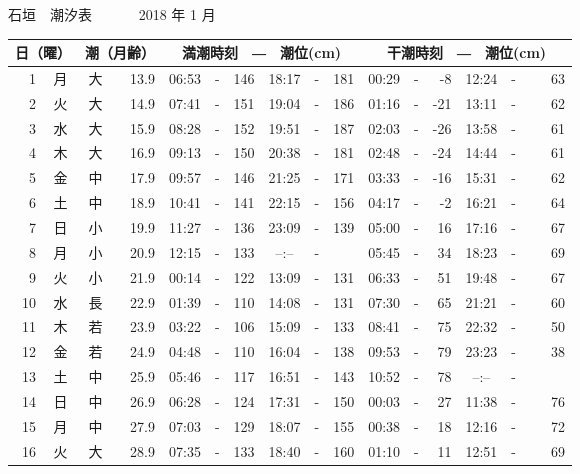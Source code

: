 \documentclass[12pt.a4j]{jsarticle}
\begin{document}
\pagestyle{empty}
 \begin{center}
 {\LARGE 石垣　潮汐表　　　}
 {\large 2018 年  1 月}\\
 \begin{table}[ht]
    \begin{tabular}{|rc|cr|ccrccr|ccrccr|}
    \hline
    \multicolumn{2}{|c|}{日（曜）} & \multicolumn{2}{c|}{潮（月齢）} & \multicolumn{6}{c|}{満潮時刻　―　潮位(cm)} & \multicolumn{6}{c|}{干潮時刻　―　潮位(cm)} \\
 \hline
 1 & 月 & 大 & 13.9 &  06:53 &-& 146  &  18:17 &-& 181  &   00:29 &-&  -8  &   12:24 &-&  63  \\
 2 & 火 & 大 & 14.9 &  07:41 &-& 151  &  19:04 &-& 186  &   01:16 &-& -21  &   13:11 &-&  62  \\
 3 & 水 & 大 & 15.9 &  08:28 &-& 152  &  19:51 &-& 187  &   02:03 &-& -26  &   13:58 &-&  61  \\
 4 & 木 & 大 & 16.9 &  09:13 &-& 150  &  20:38 &-& 181  &   02:48 &-& -24  &   14:44 &-&  61  \\
 5 & 金 & 中 & 17.9 &  09:57 &-& 146  &  21:25 &-& 171  &   03:33 &-& -16  &   15:31 &-&  62  \\
 6 & 土 & 中 & 18.9 &  10:41 &-& 141  &  22:15 &-& 156  &   04:17 &-&  -2  &   16:21 &-&  64  \\
 7 & 日 & 小 & 19.9 &  11:27 &-& 136  &  23:09 &-& 139  &   05:00 &-&  16  &   17:16 &-&  67  \\
 8 & 月 & 小 & 20.9 &  12:15 &-& 133  &  --:-- &-& ~~~  &   05:45 &-&  34  &   18:23 &-&  69  \\
 9 & 火 & 小 & 21.9 &  00:14 &-& 122  &  13:09 &-& 131  &   06:33 &-&  51  &   19:48 &-&  67  \\
10 & 水 & 長 & 22.9 &  01:39 &-& 110  &  14:08 &-& 131  &   07:30 &-&  65  &   21:21 &-&  60  \\
11 & 木 & 若 & 23.9 &  03:22 &-& 106  &  15:09 &-& 133  &   08:41 &-&  75  &   22:32 &-&  50  \\
12 & 金 & 若 & 24.9 &  04:48 &-& 110  &  16:04 &-& 138  &   09:53 &-&  79  &   23:23 &-&  38  \\
13 & 土 & 中 & 25.9 &  05:46 &-& 117  &  16:51 &-& 143  &   10:52 &-&  78  &   --:-- &-& ~~~~~\\
14 & 日 & 中 & 26.9 &  06:28 &-& 124  &  17:31 &-& 150  &   00:03 &-&  27  &   11:38 &-&  76  \\
15 & 月 & 中 & 27.9 &  07:03 &-& 129  &  18:07 &-& 155  &   00:38 &-&  18  &   12:16 &-&  72  \\
16 & 火 & 大 & 28.9 &  07:35 &-& 133  &  18:40 &-& 160  &   01:10 &-&  11  &   12:51 &-&  69  \\

\end{tabular}
\end{table}
\end{center}
\end{document}
